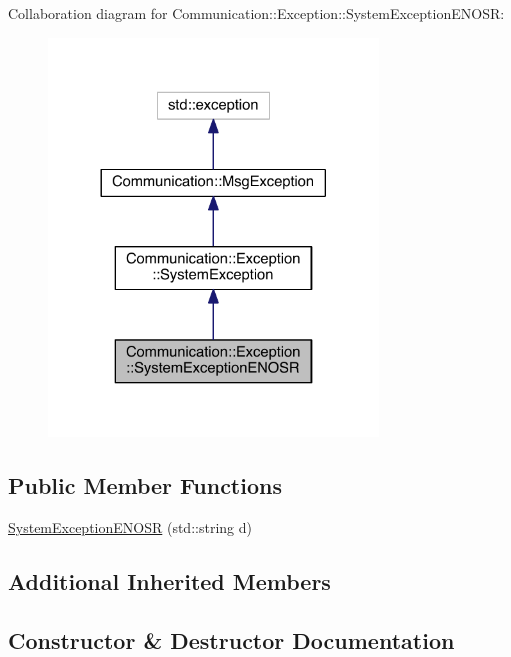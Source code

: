 Collaboration diagram for Communication\+:\+:Exception\+:\+:System\+Exception\+E\+N\+O\+S\+R\+:\nopagebreak
\begin{figure}[H]
\begin{center}
\leavevmode
\includegraphics[width=248pt]{class_communication_1_1_exception_1_1_system_exception_e_n_o_s_r__coll__graph}
\end{center}
\end{figure}
\subsection*{Public Member Functions}
\begin{DoxyCompactItemize}
\item 
\hyperlink{class_communication_1_1_exception_1_1_system_exception_e_n_o_s_r_a582f0d362de8947487838a3b4a79a8f5}{System\+Exception\+E\+N\+O\+S\+R} (std\+::string d)
\end{DoxyCompactItemize}
\subsection*{Additional Inherited Members}


\subsection{Constructor \& Destructor Documentation}
\hypertarget{class_communication_1_1_exception_1_1_system_exception_e_n_o_s_r_a582f0d362de8947487838a3b4a79a8f5}{}
